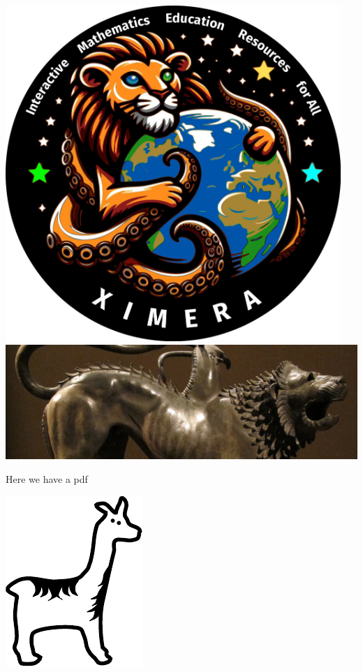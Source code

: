 \documentclass{ximera}
\begin{document}
\begin{center}
  \includegraphics[width=5in]{missionPatch.jpg}\qquad
  \includegraphics[width=.3\textwidth]{chimera.png}
\end{center}
Here we have a pdf
\begin{center}
  \includegraphics{llama.pdf}
\end{center}
\end{document}
